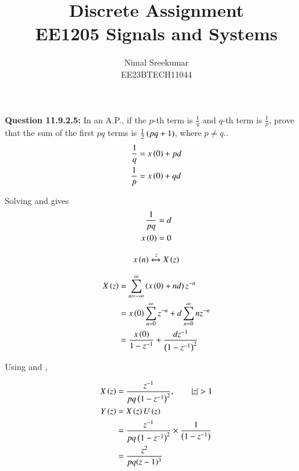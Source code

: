 \documentclass[a4,12pt,twocolumn]{IEEEtran}
\begin{document}
\let\vec\mathbf

\title{
\Huge\textbf{Discrete Assignment}\\
\Huge\textbf{EE1205} Signals and Systems\\
}
\large\author{Nimal Sreekumar\\EE23BTECH11044}

\maketitle



\bigskip

\renewcommand{\thefigure}{\theenumi}
\renewcommand{\thetable}{\theenumi}


\textbf{Question 11.9.2.5:}
In an A.P., if the \(p\)-th term is \(\frac{1}{q}\) and \(q\)-th term is \(\frac{1}{p}\), prove that the sum of the first \(pq\) terms is \(\frac{1}{2}\left(pq + 1\right)\), where \(p \neq q\)..\\

\solution
\begin{align}
    \frac{1}{q} &= x\left(0\right) + pd \\
    \frac{1}{p} &= x\left(0\right) + qd
\end{align}

Solving  and  gives
\begin{align}
    \frac{1}{pq} &= d\\
    x\left(0\right) &= 0
\end{align}

\begin{align}
x\left(n\right) \xleftrightarrow z  X\left(z\right)
\end{align}

\begin{align}
X\left(z\right) &=\sum_{n=-\infty}^{\infty} \left(x\left(0\right) + nd\right) z^{-n}\\
&= x\left(0\right) \sum_{n=0}^{\infty} z^{-n} + d \sum_{n=0}^{\infty}nz^{-n}\\
&= \frac{x\left(0\right)}{1-z^{-1}} + \frac{dz^{-1}}{\left(1-z^{-1}\right)^2}  
\end{align}

Using  and ,

\begin{align}
X\left(z\right) &= \frac{z^{-1}}{pq\left(1-z^{-1}\right)^2} , \qquad |z| > 1\\
Y\left(z\right) &= X\left(z\right)U\left(z\right) \\
&= \frac{z^{-1}}{pq\left(1-z^{-1}\right)^2} \times \frac{1}{\left(1-z^{-1}\right)}\\
&= \frac{z^2}{pq(z-1)^3}
\end{align}
\end{document}
